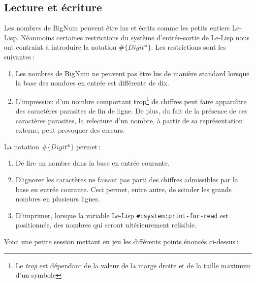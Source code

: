 \subsection{Lecture et \'ecriture}
Les nombres de BigNum peuvent \^etre lus et \'ecrits comme les petits entiers
Le-Lisp. N\'eanmoins certaines restrictions du syst\`eme d'entr\'ee-sortie
de Le-Lisp nous ont contraint \`a introduire la notation $\#\{Digit*\}$.
Les restrictions sont les suivantes\,:
\begin{enumerate}
  \item
    Les nombres de BigNum ne peuvent pas \^etre lus de mani\`ere standard
    lorsque la base des nombres en entr\'ee est diff\'erente de dix.
  \item
    L'impression d'un nombre comportant trop\footnote{Le {\em trop} est
    d\'ependant de la valeur de la marge droite et de la taille maximum d'un
    symbole} de chiffres peut faire appara\^{\i}tre des caract\`eres parasites
    de fin de ligne. De plus, du fait de la pr\'esence de ces caract\`eres
    parasites, la relecture d'un nombre, \`a partir de sa repr\'esentation
    externe, peut provoquer des erreurs.
\end{enumerate}
La notation $\#\{Digit*\}$ permet\,:
\begin{enumerate}
  \item
    De lire un nombre dans la base en entr\'ee courante.
  \item
    D'ignorer les caract\`eres ne faisant pas parti des chiffres admissibles
    par la base en entr\'ee courante. Ceci permet, entre autre, de scinder
    les grands nombres en plusieurs lignes.
  \item
    D'imprimer, lorsque la variable Le-Lisp \verb+#:system:print-for-read+
    est positionn\'ee, des nombres qui seront ult\'erieurement relisible.
\end{enumerate}
Voici une petite session mettant en jeu les diff\'erents points \'enonc\'es
ci-dessus\,:
\\[18pt]
